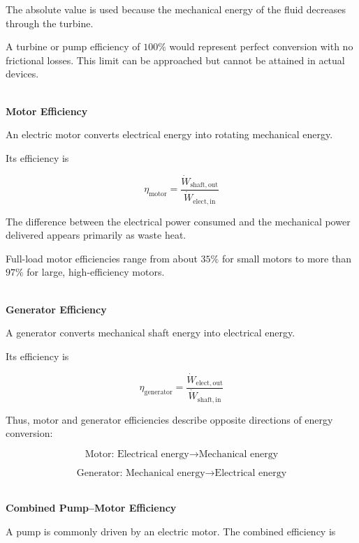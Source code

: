 \documentclass[12pt]{article}
\begin{document}
The absolute value is used because the mechanical energy of the fluid decreases through the turbine.

A turbine or pump efficiency of $100\%$ would represent perfect conversion with no frictional losses. This limit can be approached but cannot be attained in actual devices. 

\textbf{\\ Motor Efficiency}

An electric motor converts electrical energy into rotating mechanical energy.

Its efficiency is

\begin{equation*}
\eta_{\mathrm{motor}}
=
\frac{\dot{W}_{\mathrm{shaft,out}}}
{\dot{W}_{\mathrm{elect,in}}}
\end{equation*}

The difference between the electrical power consumed and the mechanical power delivered appears primarily as waste heat.

Full-load motor efficiencies range from about $35\%$ for small motors to more than $97\%$ for large, high-efficiency motors. 

\textbf{\\ Generator Efficiency}

A generator converts mechanical shaft energy into electrical energy.

Its efficiency is

\begin{equation*}
\eta_{\mathrm{generator}}
=
\frac{\dot{W}_{\mathrm{elect,out}}}
{\dot{W}_{\mathrm{shaft,in}}}
\end{equation*}

Thus, motor and generator efficiencies describe opposite directions of energy conversion:

\begin{equation*}
\text{Motor: Electrical energy}
\longrightarrow
\text{Mechanical energy}
\end{equation*}

\begin{equation*}
\text{Generator: Mechanical energy}
\longrightarrow
\text{Electrical energy}
\end{equation*}



\textbf{\\ Combined Pump--Motor Efficiency}

A pump is commonly driven by an electric motor. The combined efficiency is
\end{document}
